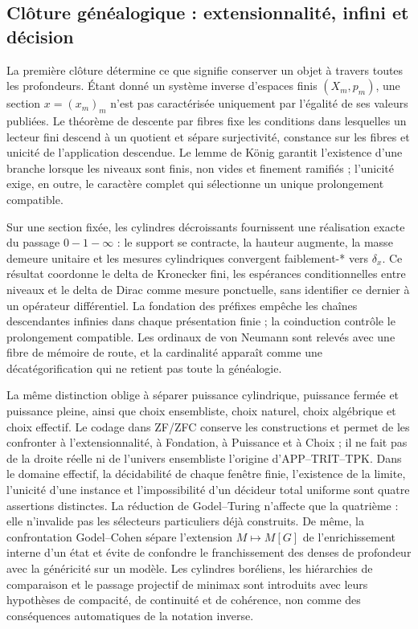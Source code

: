 \subsection*{Clôture généalogique : extensionnalité, infini et décision}

La première clôture détermine ce que signifie conserver un objet à travers
toutes les profondeurs. Étant donné un système inverse d'espaces finis
\((X_m,p_m)\), une section \(x=(x_m)_m\) n'est pas caractérisée uniquement par
l'égalité de ses valeurs publiées. Le théorème de descente par fibres fixe
les conditions dans lesquelles un lecteur fini descend à un quotient et
sépare surjectivité, constance sur les fibres et unicité de l'application descendue.
Le lemme de König garantit l'existence d'une branche lorsque les niveaux sont
finis, non vides et finement ramifiés ; l'unicité exige, en outre, le
caractère complet qui sélectionne un unique prolongement compatible.

Sur une section fixée, les cylindres décroissants fournissent une
réalisation exacte du passage \(0\!-1\!-\!\infty\) : le support se contracte, la
hauteur augmente, la masse demeure unitaire et les mesures cylindriques convergent
faiblement-* vers \(\delta_x\). Ce résultat coordonne le delta de Kronecker fini,
les espérances conditionnelles entre niveaux et le delta de Dirac comme mesure
ponctuelle, sans identifier ce dernier à un opérateur différentiel. La
fondation des préfixes empêche les chaînes descendantes infinies dans chaque
présentation finie ; la coinduction contrôle le prolongement compatible. Les
ordinaux de von Neumann sont relevés avec une fibre de mémoire de route, et la
cardinalité apparaît comme une décatégorification qui ne retient pas toute la généalogie.

La même distinction oblige à séparer puissance cylindrique, puissance fermée et
puissance pleine, ainsi que choix ensembliste, choix naturel, choix
algébrique et choix effectif. Le codage dans ZF/ZFC conserve les
constructions et permet de les confronter à l'extensionnalité, à Fondation,
à Puissance et à Choix ; il ne fait pas de la droite réelle ni de l'univers ensembliste
l'origine d'APP--TRIT--TPK\@. Dans le domaine effectif, la décidabilité de chaque
fenêtre finie, l'existence de la limite, l'unicité d'une instance et
l'impossibilité d'un décideur total uniforme sont quatre assertions distinctes.
La réduction de Godel--Turing n'affecte que la quatrième : elle n'invalide pas les sélecteurs
particuliers déjà construits. De même, la confrontation Godel--Cohen sépare
l'extension \(M\mapsto M[G]\) de l'enrichissement interne d'un état et
évite de confondre le franchissement des denses de profondeur avec la généricité sur un
modèle. Les cylindres boréliens, les hiérarchies de comparaison et le passage
projectif de minimax sont introduits avec leurs hypothèses de compacité,
de continuité et de cohérence, non comme des conséquences automatiques de la notation
inverse.

